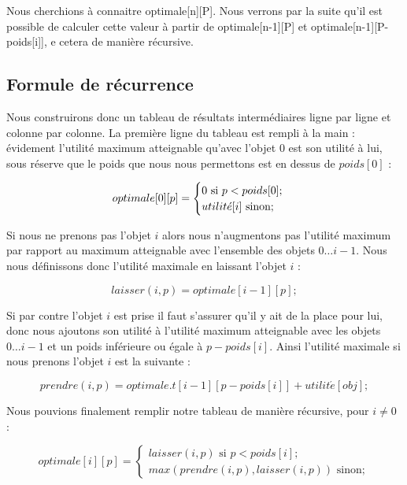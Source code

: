 Nous cherchions à connaitre optimale[n][P]. Nous verrons par la suite qu'il est possible de calculer cette valeur à partir de optimale[n-1][P] et optimale[n-1][P-poids[i]], e cetera de manière récursive.

\subsection{Formule de récurrence}
Nous construirons donc un tableau de résultats intermédiaires ligne par ligne et colonne par colonne. La première ligne du tableau est rempli à la main : évidement l'utilité maximum atteignable qu'avec l'objet $0$ est son utilité à lui, sous réserve que le poids que nous nous permettons est en dessus de $poids[0]$ :

\begin{equation}
optimale[0][p] =
	\begin{cases}
		0 \text{ si } p < poids[0];	\\
		utilit\acute{e}[i] \text{ sinon};
	\end{cases} \\
\end{equation}

Si nous ne prenons pas l'objet $i$ alors nous n'augmentons pas l'utilité maximum par rapport au maximum atteignable avec l'ensemble des objets $0 \dots i-1$. Nous nous définissons donc l'utilité maximale en laissant l'objet $i$ :

\begin{equation}
laisser(i, p) = optimale[i-1][p];
\end{equation}

Si par contre l'objet $i$ est prise il faut s'assurer qu'il y ait de la place pour lui, donc nous ajoutons son utilité à l'utilité maximum atteignable avec les objets $0 \dots i-1$ et un poids inférieure ou égale à $p-poids[i]$. Ainsi l'utilité maximale si nous prenons l'objet $i$ est la suivante :

\begin{equation}
prendre(i, p) = optimale.t[i-1][p - poids[i]] + utilit\acute{e}[obj];
\end{equation}

Nous pouvions finalement remplir notre tableau de manière récursive, pour $i \neq 0$ :

\begin{equation}
optimale[i][p] =
	\begin{cases}
		laisser(i, p) \text{ si } p < poids[i];	\\
		max(prendre(i, p), laisser(i, p)) \text{ sinon};
	\end{cases}
\end{equation}

